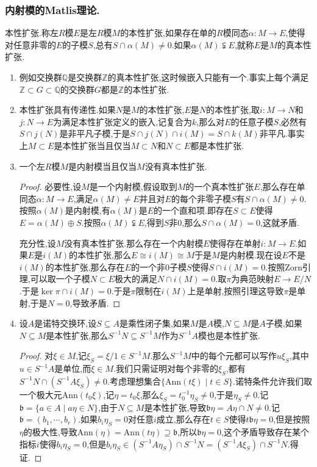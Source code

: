 \subsubsection{内射模的Matlis理论.}

本性扩张.称左$R$模$E$是左$R$模$M$的本性扩张,如果存在单的$R$模同态$\alpha:M\to E$,使得对任意非零的$E$的子模$S$,总有$S\cap\alpha(M)\not=0$.如果$\alpha(M)\subsetneqq E$,就称$E$是$M$的真本性扩张.
\begin{enumerate}
	\item 例如交换群$\mathbb{Q}$是交换群$\mathbb{Z}$的真本性扩张,这时候嵌入只能有一个.事实上每个满足$\mathbb{Z}\subset G\subset\mathbb{Q}$的交换群$G$都是$\mathbb{Z}$的本性扩张.
	\item 本性扩张具有传递性.如果$N$是$M$的本性扩张,$E$是$N$的本性扩张,取$i:M\to N$和$j:N\to E$为满足本性扩张定义的嵌入,记复合为$k$,那么对$E$的任意子模$S$,必然有$S\cap j(N)$是非平凡子模,于是$S\cap j(N)\cap i(M)=S\cap k(M)$非平凡.事实上$M\subset E$是本性扩张当且仅当$M\subset N$和$N\subset E$都是本性扩张.
	\item 一个左$R$模$M$是内射模当且仅当$M$没有真本性扩张.
	\begin{proof}
		
		必要性,设$M$是一个内射模,假设取到$M$的一个真本性扩张$E$,那么存在单同态$\alpha:M\to E$,满足$\alpha(M)\not=E$并且对$E$的每个非零子模$S$有$S\cap\alpha(M)\not=0$.按照$\alpha(M)$是内射模,有$\alpha(M)$是$E$的一个直和项.即存在$S\subset E$使得$E=\alpha(M)\oplus S$.按照$\alpha(M)\subsetneqq E$,得到$S$非0,那么$S\cap\alpha(M)=0$,这就矛盾.
		
		充分性,设$M$没有真本性扩张.那么存在一个内射模$E$使得存在单射$i:M\to E$.如果$E$是$i(M)$的本性扩张,那么$E\cong i(M)\cong M$于是$M$是内射模.现在设$E$不是$i(M)$的本性扩张,那么存在$E$的一个非0子模$S$使得$S\cap i(M)=0$.按照Zorn引理,可以取一个子模$N\subset E$极大的满足$N\cap i(M)=0$.取$\pi$为典范映射$E\to E/N$.于是$\ker\pi\cap i(M)=0$.于是$\pi$限制在$i(M)$上是单射,按照引理这导致$\pi$是单射,于是$N=0$,导致矛盾.
	\end{proof}
    \item 设$A$是诺特交换环,设$S\subseteq A$是乘性闭子集,如果$M$是$A$模,$N\subseteq M$是$A$子模,如果$N\subseteq M$是本性扩张,那么$S^{-1}N\subseteq S^{-1}M$作为$S^{-1}A$模也是本性扩张.
    \begin{proof}
    	
    	对$\xi\in M$,记$\xi_S=\xi/1\in S^{-1}M$.那么$S^{-1}M$中的每个元都可以写作$u\xi_S$,其中$u\in S^{-1}A$是单位,而$\xi\in M$.我们只需证明对每个非零的$\xi_S$,都有$S^{-1}N\cap(S^{-1}A\xi_S)\not=0$.考虑理想集合$\{\mathrm{Ann}(t\xi)\mid t\in S\}$.诺特条件允许我们取一个极大元$\mathrm{Ann}(t_0\xi)$,记$\eta=t_0\xi$,那么$\xi_S=t_0^{-1}\eta_S\not=0$,于是$\eta_S\not=0$.记$\mathfrak{b}=\{a\in A\mid a\eta\in N\}$,由于$N\subseteq M$是本性扩张,导致$\mathfrak{b}\eta=A\eta\cap N\not=0$.记$\mathfrak{b}=(b_1,\cdots,b_r)$.如果$b_i\eta_S=0$对任意$i$成立,那么存在$t\in S$使得$t\mathfrak{b}\eta=0$,但是按照$\eta$的极大性,导致$\mathrm{Ann}(\eta)=\mathrm{Ann}(t\eta)\supseteq\mathfrak{b}$,所以$\mathfrak{b}\eta=0$,这个矛盾导致存在某个指标$i$使得$b_i\eta_S=0$,但是$b_i\eta_S\in(S^{-1}A\eta_S)\cap S^{-1}N=(S^{-1}A\xi_S)\cap S^{-1}N$.得证.
    \end{proof}
\end{enumerate}

